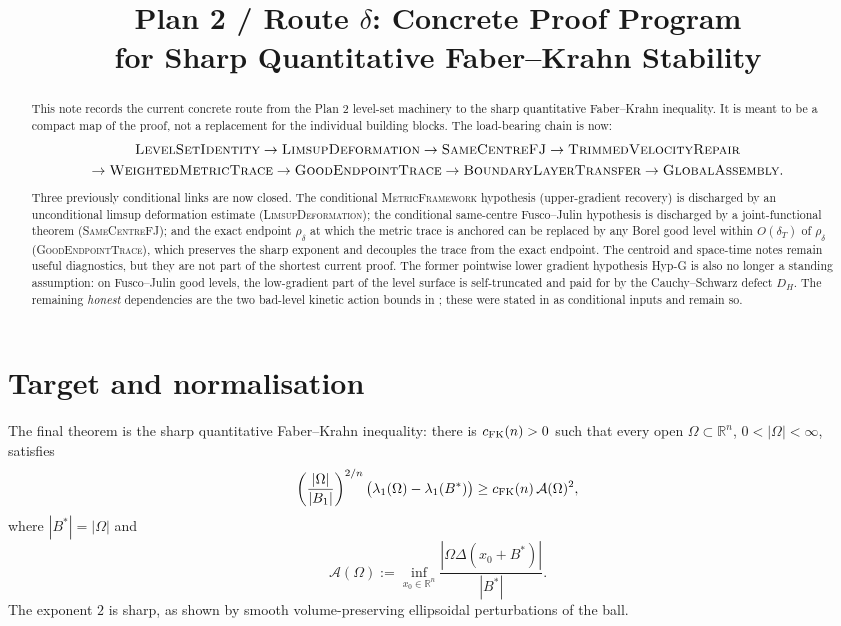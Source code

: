 \documentclass[11pt]{article}
\title{Plan 2 / Route $\delta$: Concrete Proof Program\\
for Sharp Quantitative Faber--Krahn Stability}
\author{}
\date{}
\theoremstyle{definition}
\newcommand{\R}{\mathbb{R}}
\newcommand{\Om}{\Omega}
\newcommand{\Fr}{\mathcal A}
\newcommand{\Bstar}{B^*}
\begin{document}
\maketitle

\begin{abstract}
This note records the current concrete route from the Plan 2
level-set machinery to the sharp quantitative Faber--Krahn inequality.
It is meant to be a compact map of the proof, not a replacement for the
individual building blocks.  The load-bearing chain is now:
\[
\begin{gathered}
\textsc{LevelSetIdentity}\to
\textsc{LimsupDeformation}\to
\textsc{SameCentreFJ}\to
\textsc{TrimmedVelocityRepair}\\
\to\textsc{WeightedMetricTrace}\to
\textsc{GoodEndpointTrace}\to
\textsc{BoundaryLayerTransfer}\to
\textsc{GlobalAssembly}.
\end{gathered}
\]
Three previously conditional links are now closed.  The conditional
\textsc{MetricFramework} hypothesis (upper-gradient recovery) is
discharged by an unconditional limsup deformation estimate
(\textsc{LimsupDeformation}); the conditional same-centre Fusco--Julin
hypothesis is discharged by a joint-functional theorem
(\textsc{SameCentreFJ}); and the exact endpoint $\rho_\delta$ at which
the metric trace is anchored can be replaced by any Borel good level
within $O(\delta_T)$ of $\rho_\delta$ (\textsc{GoodEndpointTrace}),
which preserves the sharp exponent and decouples the trace from the
exact endpoint.  The centroid and space-time notes remain useful
diagnostics, but they are not part of the shortest current proof.  The
former pointwise lower gradient hypothesis Hyp-G is also no longer a
standing assumption: on Fusco--Julin good levels, the low-gradient
part of the level surface is self-truncated and paid for by the
Cauchy--Schwarz defect $D_H$.  The remaining \emph{honest} dependencies
are the two bad-level kinetic action bounds in
\cite[Hyp.~3.6]{WeightedMetricTrace}; these were stated in
\cite{WeightedMetricTrace} as conditional inputs and remain so.
\end{abstract}

\section{Target and normalisation}

The final theorem is the sharp quantitative Faber--Krahn inequality:
there is $c_{\rm FK}(n)>0$ such that every open
$\Om\subset\R^n$, $0<|\Om|<\infty$, satisfies
\begin{equation}\label{eq:FK}
  \left(\frac{|\Om|}{|B_1|}\right)^{2/n}
  \bigl(\lambda_1(\Om)-\lambda_1(\Bstar)\bigr)
  \ge c_{\rm FK}(n)\,\Fr(\Om)^2 ,
\end{equation}
where $|\Bstar|=|\Om|$ and
\[
  \Fr(\Om):=\inf_{x_0\in\R^n}
  \frac{|\Om\Delta(x_0+\Bstar)|}{|\Bstar|}.
\]
The exponent $2$ is sharp, as shown by smooth volume-preserving
ellipsoidal perturbations of the ball.
\end{document}
